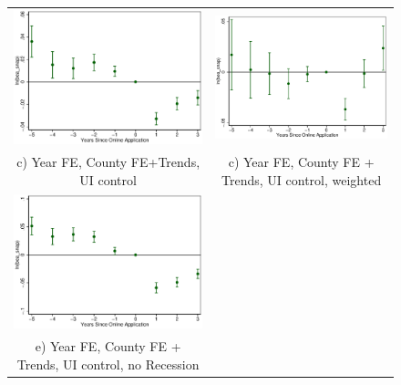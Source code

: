 \documentclass[11pt,letterpaper]{article}
\begin{document}
\begin{figure}
\begin{tabular}{cc}
\includegraphics[scale=0.57]{tabfig/evstu_bea_snap_one_yrcfcttru_5_3}&\includegraphics[scale=0.57]{tabfig/evstu_bea_snap_total_pop_yrcfcttru_5_3}\\
c) Year FE, County FE+Trends, UI control& c) Year FE, County FE + Trends, UI control, weighted\\
\includegraphics[scale=0.57]{tabfig/evstu_bea_snap_one_yrcfcttrunor_5_3}\\
e) Year FE, County FE + Trends, UI control, no Recession\\
\end{tabular}
\end{figure}
\end{document}
